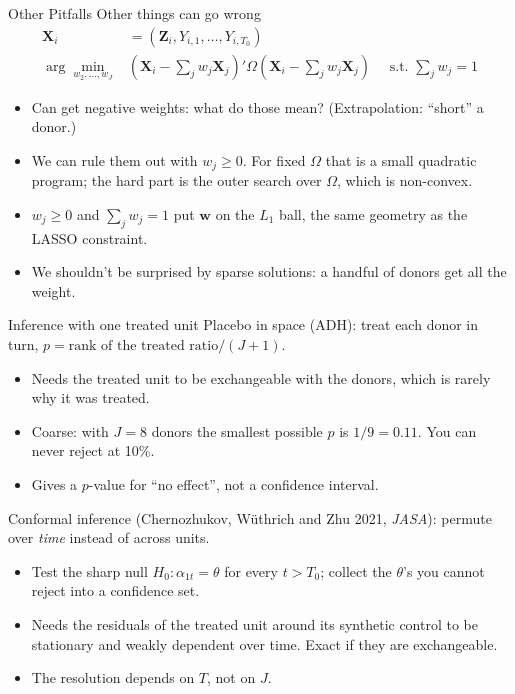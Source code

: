 \documentclass[aspectratio=169,11pt]{beamer}
\begin{document}
\begin{frame}{Other Pitfalls}
Other things can go wrong
\begin{align*}
\mathbf{X}_{i}&=\left(\mathbf{Z}_{i}, Y_{i,1},\ldots, Y_{i,T_0} \right)\\
\arg \min_{w_2,\ldots, w_J}&  (\mathbf{X}_{i}-\sum_j w_j \mathbf{X}_{j})' \Omega  (\mathbf{X}_{i}-\sum_j w_j \mathbf{X}_{j}) \quad \text{ s.t. }  \sum_j w_j =1
\end{align*}

\begin{itemize}
\item Can get negative weights: what do those mean? (Extrapolation: ``short'' a donor.)
\item We can rule them out with $w_j \geq 0$. For fixed $\Omega$ that is a small quadratic program; the hard part is the \alert{outer} search over $\Omega$, which is non-convex.
\item $w_j \geq 0$ and $\sum_j w_j = 1$ put $\mathbf{w}$ on the $L_1$ ball, the same geometry as the LASSO constraint.
\item We shouldn't be surprised by sparse solutions: a handful of donors get all the weight.
\end{itemize}
\end{frame}

\begin{frame}{Inference with one treated unit}
\alert{Placebo in space} (ADH): treat each donor in turn, $p = \text{rank of the treated ratio}/(J+1)$.
\begin{itemize}
\item Needs the treated unit to be exchangeable with the donors, which is rarely why it was treated.
\item Coarse: with $J = 8$ donors the smallest possible $p$ is $1/9 = 0.11$. You can never reject at 10\%.
\item Gives a $p$-value for ``no effect'', not a confidence interval.
\end{itemize}
\medskip
\alert{Conformal inference} (Chernozhukov, W\"uthrich and Zhu 2021, \emph{JASA}): permute over \emph{time} instead of across units.
\begin{itemize}
\item Test the sharp null $H_0: \alpha_{1t} = \theta$ for every $t > T_0$; collect the $\theta$'s you cannot reject into a confidence set.
\item Needs the residuals of the treated unit around its synthetic control to be stationary and weakly dependent over time. Exact if they are exchangeable.
\item The resolution depends on $T$, not on $J$.
\end{itemize}
\end{frame}
\end{document}
